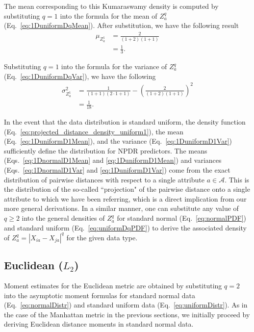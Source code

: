 \documentclass[aos]{imsart}
\begin{document}
The mean corresponding to this Kumaraswamy density is computed by substituting $q=1$ into the formula for the mean of $Z^q_a$ (Eq.~\ref{eq:1DuniformDqMean}). After substitution, we have the following result
%
\begin{equation}\label{eq:1DuniformD1Mean}
\begin{aligned}
\mu_{Z^1_a} &= \frac{2}{(1 + 2)(1 + 1)} \\
&= \frac{1}{3}.
\end{aligned}
\end{equation}

Substituting $q=1$ into the formula for the variance of $Z^q_a$ (Eq.~\ref{eq:1DuniformDqVar}), we have the following
%
\begin{equation}\label{eq:1DuniformD1Var}
\begin{aligned}
\sigma^2_{Z^1_a} &= \frac{1}{(1 + 1)(2\cdot 1 + 1)} - \left(\frac{2}{(1 + 2)(1 + 1)}\right)^2 \\
&= \frac{1}{18}.
\end{aligned}
\end{equation}

In the event that the data distribution is standard uniform, the density function (Eq.~\ref{eq:projected_distance_density_uniform1}), the mean (Eq.~\ref{eq:1DuniformD1Mean}), and the variance (Eq.~\ref{eq:1DuniformD1Var}) sufficiently define the distribution for NPDR predictors. The means (Eqs.~\ref{eq:1DnormalD1Mean} and \ref{eq:1DuniformD1Mean}) and variances (Eqs.~\ref{eq:1DnormalD1Var} and \ref{eq:1DuniformD1Var}) come from the exact distribution of pairwise distances with respect to a single attribute $a \in \mathcal{A}$. This is the distribution of the so-called ``projection" of the pairwise distance onto a single attribute to which we have been referring, which is a direct implication from our more general derivations. In a similar manner, one can substitute any value of $q \geq 2$ into the general densities of $Z^q_a$ for standard normal (Eq.~\ref{eq:normalPDF}) and standard uniform (Eq.~\ref{eq:uniformDqPDF}) to derive the associated density of $Z^q_a = |X_{ia} - X_{ja}|^q$ for the given data type.

\subsection{Euclidean \texorpdfstring{($L_2$)}{}}

Moment estimates for the Euclidean metric are obtained by substituting $q=2$ into the asymptotic moment formulas for standard normal data (Eq.~\ref{eq:normalDistr}) and standard uniform data (Eq.~\ref{eq:uniformDistr}). As in the case of the Manhattan metric in the previous sections, we initially proceed by deriving Euclidean distance moments in standard normal data.
\end{document}
